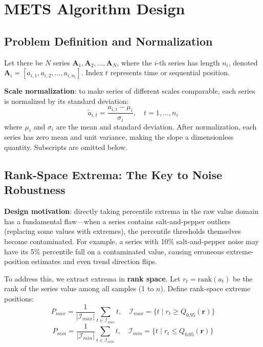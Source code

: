 \documentclass[11pt]{article}
\begin{document}
\section{METS Algorithm Design}
\subsection{Problem Definition and Normalization}
Let there be $N$ series $\mathbf{A}_1, \mathbf{A}_2, \dots, \mathbf{A}_N$, where the $i$-th series has length $n_i$, denoted $\mathbf{A}_i = [a_{i,1}, a_{i,2}, \dots, a_{i,n_i}]$. Index $t$ represents time or sequential position.

\textbf{Scale normalization}: to make series of different scales comparable, each series is normalized by its standard deviation:
\begin{equation}
\tilde{a}_{i,t} = \frac{a_{i,t} - \mu_i}{\sigma_i}, \quad t = 1, \dots, n_i
\end{equation}
where $\mu_i$ and $\sigma_i$ are the mean and standard deviation. After normalization, each series has zero mean and unit variance, making the slope a dimensionless quantity. Subscripts are omitted below.

\subsection{Rank-Space Extrema: The Key to Noise Robustness}
\textbf{Design motivation}: directly taking percentile extrema in the raw value domain has a fundamental flaw---when a series contains salt-and-pepper outliers (replacing some values with extremes), the percentile thresholds themselves become contaminated. For example, a series with 10\% salt-and-pepper noise may have its 5\% percentile fall on a contaminated value, causing erroneous extreme-position estimates and even trend direction flips.

To address this, we extract extrema in \textbf{rank space}. Let $r_t = \text{rank}(a_t)$ be the rank of the series value among all samples (1 to $n$). Define rank-space extreme positions:
\begin{equation}
P_{max} = \frac{1}{|\mathcal{I}_{max}|}\sum_{t \in \mathcal{I}_{max}} t, \quad \mathcal{I}_{max} = \{ t \mid r_t \ge Q_{0.95}(\mathbf{r}) \}
\end{equation}
\begin{equation}
P_{min} = \frac{1}{|\mathcal{I}_{min}|}\sum_{t \in \mathcal{I}_{min}} t, \quad \mathcal{I}_{min} = \{ t \mid r_t \le Q_{0.05}(\mathbf{r}) \}
\end{equation}
\end{document}
